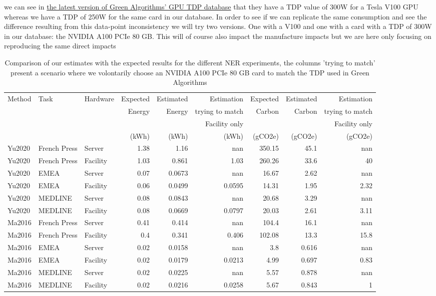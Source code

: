 \documentclass[11pt]{article}
\begin{document}
we can see in \href{https://github.com/GreenAlgorithms/green-algorithms-tool/blob/master/data/latest/TDP\_gpu.csv}{the latest version of Green Algorithms' GPU TDP database}
that they have a \gls{TDP} value of 300W for a Tesla V100 GPU whereas we
have a \gls{TDP} of 250W for the same card in our database. In order to see
if we can replicate the same consumption and see the difference
resulting from this data-point inconsistency we will try two
versions. One with a V100 and one with a card with a \gls{TDP}
of 300W in our database: the NVIDIA A100 PCIe 80 GB. This will of
course also impact the manufacture impacts but we are here only focusing on
reproducing the same direct impacts

\begin{table}[htbp]
\caption{Comparison of our estimates with the expected results for the different NER experiments, the columns 'trying to match' present a scenario where we volontarily choose an  NVIDIA A100 PCIe 80 GB card to match the TDP used in Green Algorithms}
\centering
\begin{tabular}{lllrrrrrr}
Method & Task & Hardware & Expected & Estimated & Estimation & Expected & Estimated & Estimation\\
 &  &  & Energy & Energy & trying to match & Carbon & Carbon & trying to match\\
 &  &  &  &  & Facility only &  &  & Facility only\\
 &  &  & (kWh) & (kWh) & (kWh) & (gCO2e) & (gCO2e) & (gCO2e)\\
\hline
Yu2020 & French Press & Server & 1.38 & 1.16 & nan & 350.15 & 45.1 & nan\\
Yu2020 & French Press & Facility & 1.03 & 0.861 & 1.03 & 260.26 & 33.6 & 40\\
Yu2020 & EMEA & Server & 0.07 & 0.0673 & nan & 16.67 & 2.62 & nan\\
Yu2020 & EMEA & Facility & 0.06 & 0.0499 & 0.0595 & 14.31 & 1.95 & 2.32\\
Yu2020 & MEDLINE & Server & 0.08 & 0.0843 & nan & 20.68 & 3.29 & nan\\
Yu2020 & MEDLINE & Facility & 0.08 & 0.0669 & 0.0797 & 20.03 & 2.61 & 3.11\\
Ma2016 & French Press & Server & 0.41 & 0.414 & nan & 104.4 & 16.1 & nan\\
Ma2016 & French Press & Facility & 0.4 & 0.341 & 0.406 & 102.08 & 13.3 & 15.8\\
Ma2016 & EMEA & Server & 0.02 & 0.0158 & nan & 3.8 & 0.616 & nan\\
Ma2016 & EMEA & Facility & 0.02 & 0.0179 & 0.0213 & 4.99 & 0.697 & 0.83\\
Ma2016 & MEDLINE & Server & 0.02 & 0.0225 & nan & 5.57 & 0.878 & nan\\
Ma2016 & MEDLINE & Facility & 0.02 & 0.0216 & 0.0258 & 5.67 & 0.843 & 1\\
\end{tabular}
\end{table}
\end{document}
